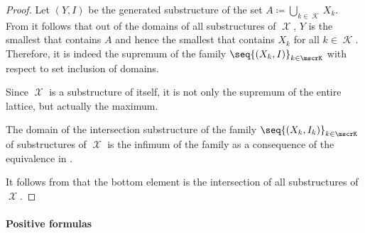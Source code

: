 \begin{proof}
   Let \( (Y, I) \) be the generated substructure of the set \( A \coloneqq \bigcup_{k \in \mscrK} X_k \). From  it follows that out of the domains of all substructures of \( \mscrX \), \( Y \) is the smallest that contains \( A \) and hence the smallest that contains \( X_k \) for all \( k \in \mscrK \). Therefore, it is indeed the supremum of the family \( \seq{ (X_k, I) }_{k \in \mscrK} \) with respect to set inclusion of domains.

   Since \( \mscrX \) is a substructure of itself, it is not only the supremum of the entire lattice, but actually the maximum.

   The domain of the intersection substructure of the family \( \seq{ (X_k, I_k) }_{k \in \mscrK} \) of substructures of \( \mscrX \) is the infimum of the family as a consequence of the equivalence in .

   It follows from  that the bottom element is the intersection of all substructures of \( \mscrX \).
\end{proof}

\paragraph{Positive formulas}

